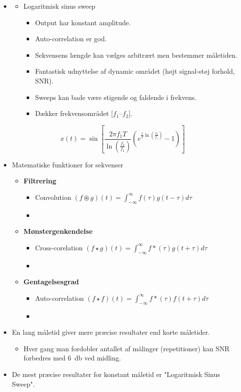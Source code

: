 \begin{itemize}
	\item[] 
	\begin{itemize}
		\item Logaritmisk sinus sweep
		\begin{itemize}
			\item Output har konstant amplitude.
			\item Auto-correlation er god.
			\item Sekvensens længde kan vælges arbitrært men bestemmer måletiden.
			\item Fantastisk udnyttelse af dynamic området (højt signal-støj forhold, SNR).
			\item Sweeps kan bade være stigende og faldende i frekvens.
			\item Dækker frekvensområdet [$f_1 – f_2$].
		\end{itemize}
	\end{itemize}
\end{itemize}

\begin{equation}
x(t)=\sin \left[\dfrac{2\pi f_1 T}{\ln
	\left(\frac{f_2}{f_1}\right)}\left(e^{\frac{t}{T}\ln
	\left(\frac{f_2}{f_1}\right)}-1\right)\right]
\end{equation}


\begin{itemize}
	\item Matematiske funktioner for sekvenser
	\begin{itemize}
		\item \textbf{Filtrering}
		\begin{itemize}
			\item Convolution $(f\circledast g)(t) = \int_{-\infty}^{\infty}f(\tau)g(t-\tau)d\tau$ 
			\item[]
		\end{itemize}
		\item \textbf{Mønstergenkendelse}
		\begin{itemize}
			\item Cross-corelation $(f\star g)(t) =\int_{-\infty}^{\infty}f*(\tau)g(t+\tau)d\tau$
			\item[]
		\end{itemize}
		\item \textbf{Gentagelsesgrad}
		\begin{itemize}
		\item Auto-correlation $(f\star f)(t) =\int_{-\infty}^{\infty}f*(\tau)f(t+\tau)d\tau$
		\item[]
		\end{itemize}
	\end{itemize}
	\item En lang måletid giver mere præcise resultater end korte måletider.
	\begin{itemize}
		\item Hver gang man fordobler antallet af målinger (repetitioner) kan SNR forbedres med \SI{6}{\decibel} ved midling.
	\end{itemize}
	\item De mest præcise resultater for konstant måletid er "Logaritmisk Sinus
	Sweep".
\end{itemize}


